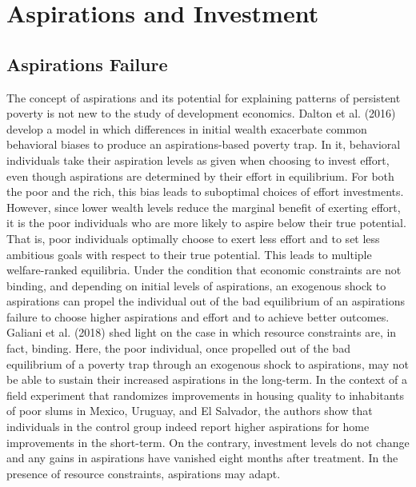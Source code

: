 \documentclass[11.5pt]{article}
\begin{document}
{\section{Aspirations and Investment} \label{sec:hypotheses}

\subsection{Aspirations Failure}

The concept of aspirations and its potential for explaining patterns of persistent poverty is not new to the study of development economics. Dalton et al. (2016) develop a model in which differences in initial wealth exacerbate common behavioral biases to produce an aspirations-based poverty trap. In it, behavioral individuals take their aspiration levels as given when choosing to invest effort, even though aspirations are determined by their effort in equilibrium. For both the poor and the rich, this bias leads to suboptimal choices of effort investments. However, since lower wealth levels reduce the marginal benefit of exerting effort, it is the poor individuals who are more likely to aspire below their true potential. That is, poor individuals optimally choose to exert less effort and to set less ambitious goals with respect to their true potential. This leads to multiple welfare-ranked equilibria. Under the condition that economic constraints are not binding, and depending on initial levels of aspirations, an exogenous shock to aspirations can propel the individual out of the bad equilibrium of an aspirations failure to choose higher aspirations and effort and to achieve better outcomes. Galiani et al. (2018) shed light on the case in which resource constraints are, in fact, binding. Here, the poor individual, once propelled out of the bad equilibrium of a poverty trap through an exogenous shock to aspirations, may not be able to sustain their increased aspirations in the long-term. In the context of a field experiment that randomizes improvements in housing quality to inhabitants of poor slums in Mexico, Uruguay, and El Salvador, the authors show that individuals in the control group indeed report higher aspirations for home improvements in the short-term. On the contrary, investment levels do not change and any gains in aspirations have vanished eight months after treatment. In the presence of resource constraints, aspirations may adapt.

}
\end{document}
